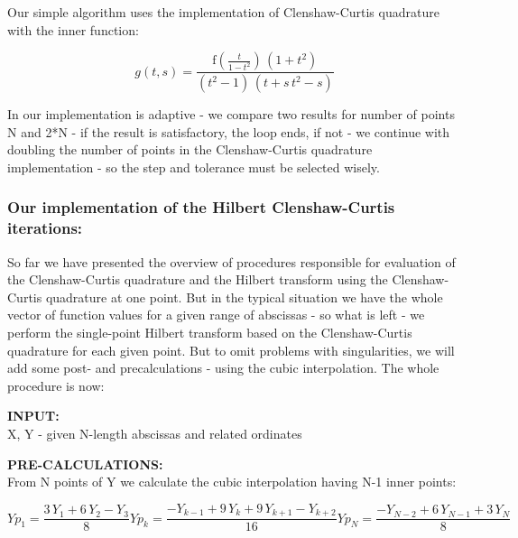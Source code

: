 \documentclass[12pt,twoside,a4paper]{article}
\def\emptyline{\vspace{12pt}}
\numberwithin{equation}{subsection}
\numberwithin{figure}{subsection}
\begin{document}
Our simple algorithm uses the implementation of Clenshaw-Curtis quadrature with the inner function:

\begin{equation} \label{eq:cci_innerfun} 
  g(t,s) = \frac {\mathrm{f}(\frac {t}{1 - t^{2}})\,(1 + t^{2})}{(t^{2} - 1)\,(t + s\,t^{2} - s)}
\end{equation}
 
In our implementation is adaptive - we compare two results for number of points N and 2*N - if the result is satisfactory, the loop
ends, if not - we continue with doubling the number of points in the Clenshaw-Curtis quadrature implementation - so the step and
tolerance must be selected wisely.

\subsubsection*{Our implementation of the Hilbert Clenshaw-Curtis iterations:}

So far we have presented the overview of procedures responsible for evaluation of the Clenshaw-Curtis quadrature and the Hilbert
transform using the Clenshaw-Curtis quadrature at one point. But in the typical situation we have the whole vector of function
values for a given range of abscissas - so what is left - we perform the single-point Hilbert transform based on the
Clenshaw-Curtis quadrature for each given point. But to omit problems with singularities, we will add some post- and
precalculations - using the cubic interpolation. The whole procedure is now:

\textbf{INPUT:} \\ 
X, Y - given N-length abscissas and related ordinates

\emptyline

\textbf{PRE-CALCULATIONS:} \\
From N points of Y we calculate the cubic interpolation having N-1 inner points:

\begin{subequations} \label{eq:cci_cubicinterpolation}
  \begin{equation}   \label{eq:ccicinterp_first}
    {Yp_{1}}=\frac {3\,{Y_{1}} + 6\,{Y_{2}} - {Y_{3}}}{8}
  \end{equation}
  \begin{equation}   \label{eq:ccicinterp_next}
    {Yp_{k}}=\frac { - {Y_{k - 1}} + 9\,{Y_{k}} + 9\,{Y_{k + 1}} - {Y_{k + 2}}}{16}
  \end{equation}
  \begin{equation}   \label{eq:ccicinterp_last}
    {Yp_{N}}=\frac { - {Y_{N - 2}} + 6\,{Y_{N - 1}} + 3\,{Y_{N}}}{8}
  \end{equation}
\end{subequations}
\end{document}
